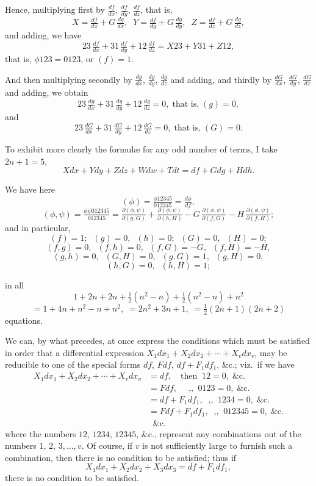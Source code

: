 \documentclass[11pt]{article}
\begin{document}
Hence, multiplying first by $\tfrac{df}{dx}$, $\tfrac{df}{dy}$, $\tfrac{df}{dz}$, that is,
\[ X = \tfrac{df}{dx} + G\,\tfrac{dg}{dx},\;\;Y = \tfrac{df}{dy} + G\,\tfrac{dg}{dy},\;\;Z = \tfrac{df}{dz} + G\,\tfrac{dg}{dz}, \]
and adding, we have
\[ 23\,\tfrac{df}{dx} + 31\,\tfrac{df}{dy} + 12\,\tfrac{df}{dz} = X23 + Y31 + Z12, \]
that is, $\phi 123 = 0123$, or $(f) = 1$.

And then multiplying secondly by $\tfrac{dg}{dx}$, $\tfrac{dg}{dy}$, $\tfrac{dg}{dz}$ and adding, and thirdly by $\tfrac{dG}{dx}$, $\tfrac{dG}{dy}$, $\tfrac{dG}{dz}$ and adding, we obtain
\[ 23\,\tfrac{dg}{dx} + 31\,\tfrac{dg}{dy} + 12\,\tfrac{dg}{dz} = 0,\;\text{that is,}\;(g) = 0, \]
and
\[ 23\,\tfrac{dG}{dx} + 31\,\tfrac{dG}{dy} + 12\,\tfrac{dG}{dz} = 0,\;\text{that is,}\;(G) = 0. \]

To exhibit more clearly the formul\ae{} for any odd number of terms, I take $2n+1=5$,
\[ Xdx + Ydy + Zdz + Wdw + Tdt = df + Gdg + Hdh. \]

We have here
\[ (\phi) = \tfrac{\phi 12345}{012345} = \tfrac{d\phi}{df}, \]
\[ (\phi,\psi) = \tfrac{\phi\psi 012345}{012345} = \tfrac{\partial(\phi,\psi)}{\partial(g,G)} + \tfrac{\partial(\phi,\psi)}{\partial(h,H)} - G\,\tfrac{\partial(\phi,\psi)}{\partial(f,G)} - H\,\tfrac{\partial(\phi,\psi)}{\partial(f,H)}; \]
and in particular,
\[ (f) = 1;\;\;(g) = 0,\;\;(h) = 0;\;\;(G) = 0,\;\;(H) = 0; \]
\[ (f,g) = 0,\;\;(f,h) = 0,\;\;(f,G) = -G,\;\;(f,H) = -H, \]
\[ (g,h) = 0,\;\;(G,H) = 0,\;\;(g,G) = 1,\;\;(g,H) = 0, \]
\[ (h,G) = 0,\;\;(h,H) = 1; \]

\medskip
in all
\[ 1 + 2n + 2n + \tfrac{1}{2}(n^{2}-n) + \tfrac{1}{2}(n^{2}-n) + n^{2} \]
\[ = 1 + 4n + n^{2} - n + n^{2},\; = 2n^{2} + 3n + 1,\; = \tfrac{1}{2}(2n+1)(2n+2) \]
equations.

\medskip
We can, by what precedes, at once express the conditions which must be satisfied in order that a differential expression $X_{1}dx_{1} + X_{2}dx_{2} + \cdots + X_{v}dx_{v}$, may be reducible to one of the special forms $df$, $Fdf$, $df + F_{1}df_{1}$, \&c.; viz.\ if we have
\begin{align*}
X_{1}dx_{1} + X_{2}dx_{2} + \cdots + X_{v}dx_{v} &= df,\quad \text{then}\;\;12 = 0,\;\&\text{c.}\\
 &= Fdf,\quad\; \text{,,}\;\;0123 = 0,\;\&\text{c.}\\
 &= df + F_{1}df_{1},\;\;\text{,,}\;\;1234 = 0,\;\&\text{c.}\\
 &= Fdf + F_{1}df_{1},\;\;\text{,,}\;\;012345 = 0,\;\&\text{c.}\\
 &\;\;\&\text{c.}
\end{align*}
where the numbers $12$, $1234$, $12345$, \&c., represent any combinations out of the numbers $1$, $2$, $3,\ldots,v$. Of course, if $v$ is not sufficiently large to furnish such a combination, then there is no condition to be satisfied; thus if
\[ X_{1}dx_{1} + X_{2}dx_{2} + X_{3}dx_{3} = df + F_{1}df_{1}, \]
there is no condition to be satisfied.
\end{document}
